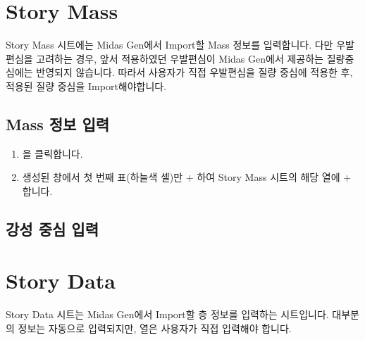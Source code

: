 \documentclass[a4paper,11pt,korean,openany,oneside]{sphinxmanual}
\begin{document}
\sphinxstepscope


\section{Story Mass}
\label{\detokenize{2_story_mass:story-mass}}\label{\detokenize{2_story_mass::doc}}
\sphinxAtStartPar
Story Mass 시트에는 Midas Gen에서 Import할 Mass 정보를 입력합니다.
다만 우발편심을 고려하는 경우, 앞서 적용하였던 우발편심이 Midas Gen에서 제공하는 질량중심에는 반영되지 않습니다.
따라서 사용자가 직접 우발편심을 질량 중심에 적용한 후, 적용된 질량 중심을 Import해야합니다.


\subsection{Mass 정보 입력}
\label{\detokenize{2_story_mass:mass}}
\begin{sphinxShadowBox}
\begin{enumerate}
%
\item {} 
\sphinxAtStartPar
{} \sphinxhyphen{} 을 클릭합니다.

\item {} 
\sphinxAtStartPar
생성된 창에서 첫 번째 표(하늘색 셀)만 + 하여 Story Mass 시트의 해당 열에 + 합니다.

\end{enumerate}
\end{sphinxShadowBox}


\subsection{강성 중심 입력}
\label{\detokenize{2_story_mass:id1}}
\sphinxstepscope


\section{Story Data}
\label{\detokenize{2_story_data:story-data}}\label{\detokenize{2_story_data::doc}}
\sphinxAtStartPar
Story Data 시트는 Midas Gen에서 Import할 층 정보를 입력하는 시트입니다.
대부분의 정보는 자동으로 입력되지만, 열은 사용자가 직접 입력해야 합니다.

\sphinxstepscope
\end{document}
